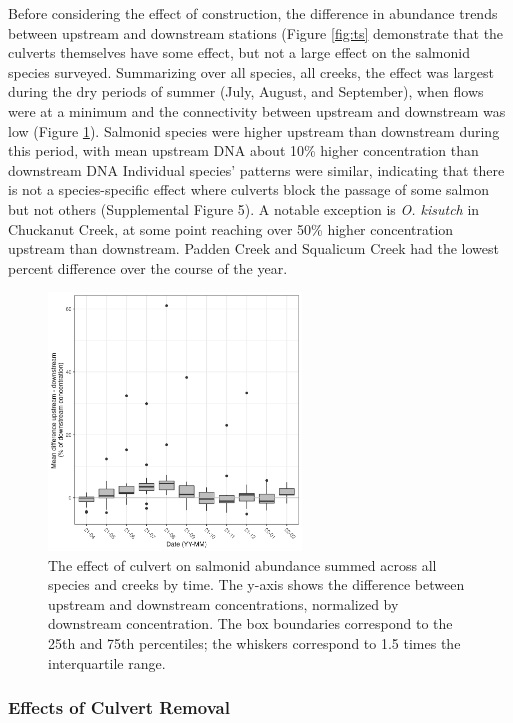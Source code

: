 \documentclass[
]{article}
\begin{document}
Before considering the effect of construction, the difference in
abundance trends between upstream and downstream stations (Figure
\ref{fig:ts} demonstrate that the culverts themselves have some effect,
but not a large effect on the salmonid species surveyed. Summarizing
over all species, all creeks, the effect was largest during the dry
periods of summer (July, August, and September), when flows were at a
minimum and the connectivity between upstream and downstream was low
(Figure \ref{fig:culverts}). Salmonid species were higher upstream than
downstream during this period, with mean upstream DNA about 10\% higher
concentration than downstream DNA Individual species' patterns were
similar, indicating that there is not a species-specific effect where
culverts block the passage of some salmon but not others (Supplemental
Figure 5). A notable exception is \emph{O. kisutch} in Chuckanut Creek,
at some point reaching over 50\% higher concentration upstream than
downstream. Padden Creek and Squalicum Creek had the lowest percent
difference over the course of the year.

\begin{figure}
\centering
\includegraphics[width=0.6\textwidth,height=\textheight]{../Output/Figures/20221129_culvert_effect_flowcorrected.png}
\caption{The effect of culvert on salmonid abundance summed across all
species and creeks by time. The y-axis shows the difference between
upstream and downstream concentrations, normalized by downstream
concentration. The box boundaries correspond to the 25th and 75th
percentiles; the whiskers correspond to 1.5 times the interquartile
range.\label{fig:culverts}}
\end{figure}

\hypertarget{effects-of-culvert-removal}{%
\subsubsection{Effects of Culvert
Removal}\label{effects-of-culvert-removal}}
\end{document}
